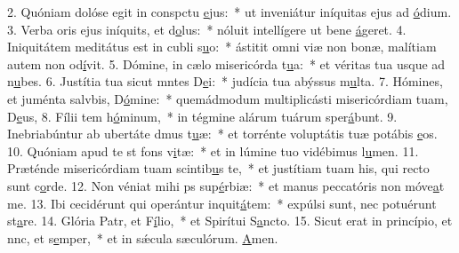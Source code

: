 2. Quóniam dolóse egit in conspctu \uline{e}jus:~* ut inveniátur iníquitas ejus ad \uline{ó}dium.
3. Verba oris ejus iníquits, et d\uline{o}lus:~* nóluit intellígere ut bene \uline{á}geret.
4. Iniquitátem meditátus est in cubli s\uline{u}o:~* ástitit omni viæ non bonæ, malítiam autem non od\uline{í}vit.
5. Dómine, in cælo misericórda t\uline{u}a:~* et véritas tua usque ad n\uline{u}bes.
6. Justítia tua sicut mntes D\uline{e}i:~* judícia tua abýssus m\uline{u}lta.
7. Hómines, et juménta salvbis, D\uline{ó}mine:~* quemádmodum multiplicásti misericórdiam tuam, D\uline{e}us,
8. Fílii tem h\uline{ó}minum,~* in tégmine alárum tuárum sper\uline{á}bunt.
9. Inebriabúntur ab ubertáte dmus t\uline{u}æ:~* et torrénte voluptátis tuæ potábis \uline{e}os.
10. Quóniam apud te st fons v\uline{i}tæ:~* et in lúmine tuo vidébimus l\uline{u}men.
11. Præténde misericórdiam tuam scintib\uline{u}s te,~* et justítiam tuam his, qui recto sunt c\uline{o}rde.
12. Non véniat mihi ps sup\uline{é}rbiæ:~* et manus peccatóris non móve\uline{a}t me.
13. Ibi cecidérunt qui operántur inquit\uline{á}tem:~* expúlsi sunt, nec potuérunt st\uline{a}re.
14. Glória Patr, et F\uline{í}lio,~* et Spirítui S\uline{a}ncto.
15. Sicut erat in princípio, et nnc, et s\uline{e}mper,~* et in sǽcula sæculórum. \uline{A}men.
